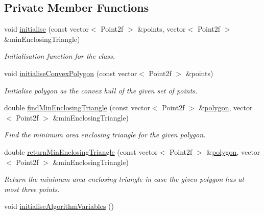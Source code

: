 \subsection*{Private Member Functions}
\begin{DoxyCompactItemize}
\item 
void \hyperlink{classmultiscale_1_1MinEnclosingTriangleFinder_a6fa2b447626f765d0b9600cabdc810ae}{initialise} (const vector$<$ Point2f $>$ \&points, vector$<$ Point2f $>$ \&min\-Enclosing\-Triangle)
\begin{DoxyCompactList}\small\item\em Initialisation function for the class. \end{DoxyCompactList}\item 
void \hyperlink{classmultiscale_1_1MinEnclosingTriangleFinder_afe8fe342d7ec338ccc0874cce91f2a58}{initialise\-Convex\-Polygon} (const vector$<$ Point2f $>$ \&points)
\begin{DoxyCompactList}\small\item\em Initialise polygon as the convex hull of the given set of points. \end{DoxyCompactList}\item 
double \hyperlink{classmultiscale_1_1MinEnclosingTriangleFinder_a0b55638741cd5ff84d583df33d594a69}{find\-Min\-Enclosing\-Triangle} (const vector$<$ Point2f $>$ \&\hyperlink{classmultiscale_1_1MinEnclosingTriangleFinder_add5aecf2c138345091d55076bdc253a4}{polygon}, vector$<$ Point2f $>$ \&min\-Enclosing\-Triangle)
\begin{DoxyCompactList}\small\item\em Find the minimum area enclosing triangle for the given polygon. \end{DoxyCompactList}\item 
double \hyperlink{classmultiscale_1_1MinEnclosingTriangleFinder_af6e49a1ef5a0d4dbe3e25c2f92d69dc3}{return\-Min\-Enclosing\-Triangle} (const vector$<$ Point2f $>$ \&\hyperlink{classmultiscale_1_1MinEnclosingTriangleFinder_add5aecf2c138345091d55076bdc253a4}{polygon}, vector$<$ Point2f $>$ \&min\-Enclosing\-Triangle)
\begin{DoxyCompactList}\small\item\em Return the minimum area enclosing triangle in case the given polygon has at most three points. \end{DoxyCompactList}\item 
void \hyperlink{classmultiscale_1_1MinEnclosingTriangleFinder_ab41a0d36789e6dfb720325ce494b21f6}{initialise\-Algorithm\-Variables} ()

\end{DoxyCompactItemize}
